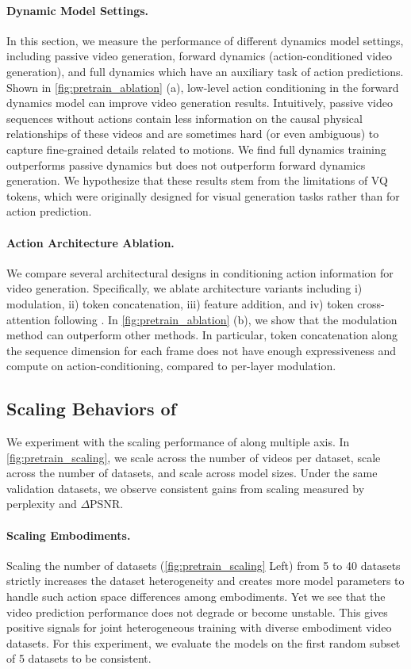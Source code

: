 \paragraph{Dynamic Model Settings.} In this section, we measure the performance of different dynamics model settings, including passive video generation, forward dynamics (action-conditioned video generation), and full dynamics which have an auxiliary task of action predictions. Shown in \cref{fig:pretrain_ablation} (a), low-level action conditioning in the forward dynamics model can improve video generation results. Intuitively, passive video sequences without actions contain less information on the causal physical relationships of these videos and are sometimes hard (or even ambiguous) to capture fine-grained details related to motions. We find full dynamics training outperforms passive dynamics but does not outperform forward dynamics generation. We hypothesize that these results stem from the limitations of VQ tokens, which were originally designed for visual generation tasks rather than for action prediction.


\paragraph{Action Architecture Ablation.} We compare several architectural designs in conditioning action information for video generation. Specifically, we ablate architecture variants including i) modulation, ii) token concatenation, iii) feature addition, and iv) token cross-attention following \cite{peebles2023scalable}. In \cref{fig:pretrain_ablation} (b), we show that the modulation method can outperform other methods.  In particular, token concatenation along the sequence dimension for each frame does not have enough expressiveness and compute on action-conditioning, compared to per-layer modulation. 


\subsection{Scaling Behaviors of \ourshort}
We experiment with the scaling performance of \ourshort along multiple axis. In \cref{fig:pretrain_scaling}, we scale across the number of videos per dataset, scale across the number of datasets, and scale across model sizes. Under the same validation datasets, we observe consistent gains from scaling measured by perplexity and $\Delta$PSNR.  

\paragraph{Scaling Embodiments.} Scaling the number of datasets (\cref{fig:pretrain_scaling} Left) from 5 to 40 datasets strictly increases the dataset heterogeneity and creates more model parameters to handle such action space differences among embodiments. Yet we see that the video prediction performance does not degrade or become unstable. This gives positive signals for joint heterogeneous training with diverse embodiment video datasets. For this experiment, we evaluate the models on the first random subset of 5 datasets to be consistent. 


